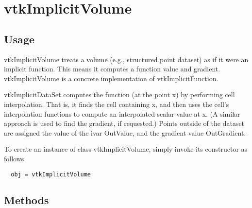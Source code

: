 \section{vtkImplicitVolume}

\subsection{Usage}

 vtkImplicitVolume treats a volume (e.g., structured point dataset)
 as if it were an implicit function. This means it computes a function
 value and gradient. vtkImplicitVolume is a concrete implementation of 
 vtkImplicitFunction.

 vtkImplicitDataSet computes the function (at the point x) by performing 
 cell interpolation. That is, it finds the cell containing x, and then
 uses the cell's interpolation functions to compute an interpolated
 scalar value at x. (A similar approach is used to find the
 gradient, if requested.) Points outside of the dataset are assigned 
 the value of the ivar OutValue, and the gradient value OutGradient.

To create an instance of class vtkImplicitVolume, simply
invoke its constructor as follows
\begin{verbatim}
  obj = vtkImplicitVolume
\end{verbatim}
\subsection{Methods}

